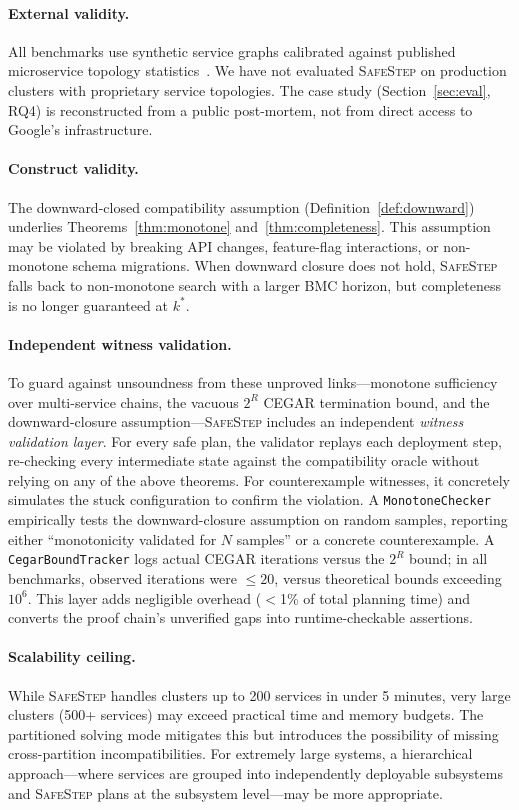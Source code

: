 \documentclass[10pt,twocolumn]{article}
\newcommand{\safestep}{\textsc{SafeStep}}
\begin{document}
\paragraph{External validity.}
All benchmarks use synthetic service graphs calibrated against
published microservice topology statistics~\cite{zhou-microservices-2018}.
We have not evaluated \safestep{} on production clusters with
proprietary service topologies. The case study
(Section~\ref{sec:eval}, RQ4) is reconstructed from a public
post-mortem, not from direct access to Google's infrastructure.

\paragraph{Construct validity.}
The downward-closed compatibility assumption
(Definition~\ref{def:downward}) underlies
Theorems~\ref{thm:monotone} and~\ref{thm:completeness}. This
assumption may be violated by breaking API changes,
feature-flag interactions, or non-monotone schema migrations.
When downward closure does not hold, \safestep{} falls back
to non-monotone search with a larger BMC horizon, but
completeness is no longer guaranteed at $k^{*}$.

\paragraph{Independent witness validation.}
To guard against unsoundness from these unproved links---monotone
sufficiency over multi-service chains, the vacuous $2^R$ CEGAR
termination bound, and the downward-closure assumption---\safestep{}
includes an independent \emph{witness validation layer}.  For every
safe plan, the validator replays each deployment step, re-checking
every intermediate state against the compatibility oracle without
relying on any of the above theorems.  For counterexample witnesses,
it concretely simulates the stuck configuration to confirm the
violation.  A \texttt{MonotoneChecker} empirically tests the
downward-closure assumption on random samples, reporting either
``monotonicity validated for $N$ samples'' or a concrete
counterexample.  A \texttt{CegarBoundTracker} logs actual CEGAR
iterations versus the $2^R$ bound; in all benchmarks, observed
iterations were $\le 20$, versus theoretical bounds exceeding
$10^{6}$.  This layer adds negligible overhead ($<$1\% of total
planning time) and converts the proof chain's unverified gaps into
runtime-checkable assertions.

\paragraph{Scalability ceiling.}
While \safestep{} handles clusters up to 200 services in
under 5 minutes, very large clusters (500+ services) may
exceed practical time and memory budgets. The partitioned
solving mode mitigates this but introduces the possibility of
missing cross-partition incompatibilities. For extremely large
systems, a hierarchical approach---where services are grouped
into independently deployable subsystems and \safestep{} plans
at the subsystem level---may be more appropriate.
\end{document}
